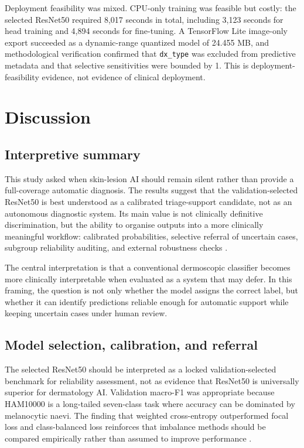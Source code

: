 \documentclass[11pt,a4paper]{article}
\newcommand{\dataset}{HAM10000}
\begin{document}
Deployment feasibility was mixed. CPU-only training was feasible but costly: the selected ResNet50 required 8,017 seconds in total, including 3,123 seconds for head training and 4,894 seconds for fine-tuning. A TensorFlow Lite image-only export succeeded as a dynamic-range quantized model of 24.455 MB, and methodological verification confirmed that \texttt{dx\_type} was excluded from predictive metadata and that selective sensitivities were bounded by 1. This is deployment-feasibility evidence, not evidence of clinical deployment.

\section{Discussion}

\subsection{Interpretive summary}

This study asked when skin-lesion AI should remain silent rather than provide a full-coverage automatic diagnosis. The results suggest that the validation-selected ResNet50 is best understood as a calibrated triage-support candidate, not as an autonomous diagnostic system. Its main value is not clinically definitive discrimination, but the ability to organise outputs into a more clinically meaningful workflow: calibrated probabilities, selective referral of uncertain cases, subgroup reliability auditing, and external robustness checks \citep{guo2017calibration,elyaniv2010selective,collins2024tripodai,vasey2022decideai}.

The central interpretation is that a conventional dermoscopic classifier becomes more clinically interpretable when evaluated as a system that may defer. In this framing, the question is not only whether the model assigns the correct label, but whether it can identify predictions reliable enough for automatic support while keeping uncertain cases under human review.

\subsection{Model selection, calibration, and referral}

The selected ResNet50 should be interpreted as a locked validation-selected benchmark for reliability assessment, not as evidence that ResNet50 is universally superior for dermatology AI. Validation macro-F1 was appropriate because \dataset{} is a long-tailed seven-class task where accuracy can be dominated by melanocytic naevi. The finding that weighted cross-entropy outperformed focal loss and class-balanced loss reinforces that imbalance methods should be compared empirically rather than assumed to improve performance \citep{tschandl2018ham10000,lin2017focal,cui2019classbalanced,gessert2020efficientnets}.
\end{document}
